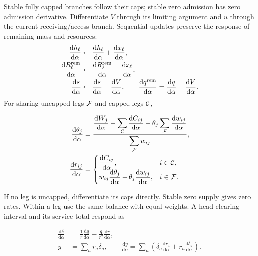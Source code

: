 \documentclass[10pt,a4paper]{article}
\newenvironment{revision}{\begingroup\color{revisionred}}{\par\endgroup}
\begin{document}
\begin{revision}
Stable fully capped branches follow their caps; stable zero admission
has zero admission derivative. Differentiate $V$ through its limiting
argument and $u$ through the current receiving/access branch. Sequential
updates preserve the response of remaining mass and resources:
\begin{equation}
 \begin{aligned}
 \frac{\mathrm dh_\ell}{\mathrm d\alpha}&\leftarrow
  \frac{\mathrm dh_\ell}{\mathrm d\alpha}
                  +\frac{\mathrm dx_\ell}{\mathrm d\alpha},\\
 \frac{\mathrm dR_\ell^{\rm rem}}{\mathrm d\alpha}&\leftarrow
  \frac{\mathrm dR_\ell^{\rm rem}}{\mathrm d\alpha}
                  -\frac{\mathrm dx_\ell}{\mathrm d\alpha},\\
 \frac{\mathrm ds}{\mathrm d\alpha}&\leftarrow
  \frac{\mathrm ds}{\mathrm d\alpha}-\frac{\mathrm dV}{\mathrm d\alpha},
 \qquad
 \frac{\mathrm dq^{\rm rem}}{\mathrm d\alpha}
  =\frac{\mathrm dq}{\mathrm d\alpha}-\frac{\mathrm dV}{\mathrm d\alpha}.
 \end{aligned}
 \label{eq:scan-derivative}
\end{equation}
For sharing uncapped legs ${\cal F}$ and capped legs ${\cal C}$,

\begin{equation}
 \begin{aligned}
 \frac{\mathrm d\theta_j}{\mathrm d\alpha}
 &=\frac{\displaystyle
 \frac{\mathrm dW_j}{\mathrm d\alpha}
 -\sum_{\cal C}\frac{\mathrm dC_{ij}}{\mathrm d\alpha}
 -\theta_j\sum_{\cal F}\frac{\mathrm dw_{ij}}{\mathrm d\alpha}}
 {\displaystyle\sum_{\cal F}w_{ij}},\\
 \frac{\mathrm dr_{ij}}{\mathrm d\alpha}
 &=\begin{cases}
 \displaystyle\frac{\mathrm dC_{ij}}{\mathrm d\alpha},&i\in{\cal C},\\
 \displaystyle w_{ij}\frac{\mathrm d\theta_j}{\mathrm d\alpha}
       +\theta_j\frac{\mathrm dw_{ij}}{\mathrm d\alpha},&i\in{\cal F}.
 \end{cases}
 \end{aligned}
 \label{eq:sharing-derivative}
\end{equation}

If no leg is uncapped, differentiate its caps directly. Stable zero
supply gives zero rates. Within a leg use the same balance with equal
weights. A head-clearing interval and its service total respond as

\begin{equation}
 \begin{aligned}
 \frac{\mathrm d\delta}{\mathrm d\alpha}
 &=\frac1r\frac{\mathrm dq}{\mathrm d\alpha}
      -\frac q{r^2}\frac{\mathrm dr}{\mathrm d\alpha},\\
 y&=\sum_a r_a\delta_a,\qquad
 \frac{\mathrm dy}{\mathrm d\alpha}
 =\sum_a\left(\delta_a\frac{\mathrm dr_a}{\mathrm d\alpha}
              +r_a\frac{\mathrm d\delta_a}{\mathrm d\alpha}\right).
 \end{aligned}
 \label{eq:service-derivative}
\end{equation}


\end{revision}
\end{document}
